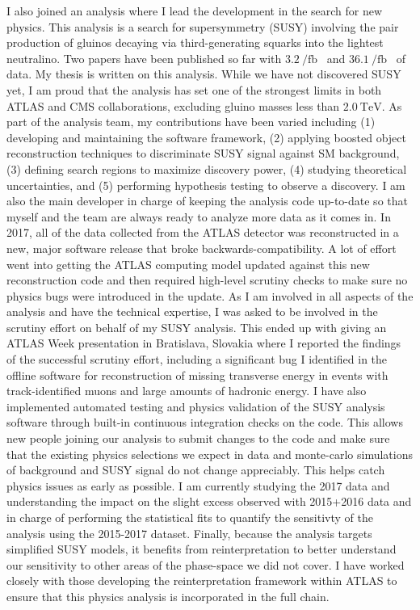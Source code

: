 \documentclass[letterpaper, 10pt]{article}
\begin{document}
I also joined an analysis where I lead the development in the search for new physics. This analysis is a search for supersymmetry (SUSY) involving the pair production of gluinos decaying via third-generating squarks into the lightest neutralino. Two papers have been published so far with $\SI{3.2}{\per\femto\barn}$~ and $\SI{36.1}{\per\femto\barn}$~ of data. My thesis is written on this analysis. While we have not discovered SUSY yet, I am proud that the analysis has set one of the strongest limits in both ATLAS and CMS collaborations, excluding gluino masses less than $\SI{2.0}{\tera\electronvolt}$. As part of the analysis team, my contributions have been varied including (1) developing and maintaining the software framework, (2) applying boosted object reconstruction techniques to discriminate SUSY signal against SM background, (3) defining search regions to maximize discovery power, (4) studying theoretical uncertainties, and (5) performing hypothesis testing to observe a discovery. I am also the main developer in charge of keeping the analysis code up-to-date so that myself and the team are always ready to analyze more data as it comes in. In 2017, all of the data collected from the ATLAS detector was reconstructed in a new, major software release that broke backwards-compatibility. A lot of effort went into getting the ATLAS computing model updated against this new reconstruction code and then required high-level scrutiny checks to make sure no physics bugs were introduced in the update. As I am involved in all aspects of the analysis and have the technical expertise, I was asked to be involved in the scrutiny effort on behalf of my SUSY analysis. This ended up with giving an ATLAS Week presentation in Bratislava, Slovakia where I reported the findings of the successful scrutiny effort, including a significant bug I identified in the offline software for reconstruction of missing transverse energy in events with track-identified muons and large amounts of hadronic energy. I have also implemented automated testing and physics validation of the SUSY analysis software through built-in continuous integration checks on the code. This allows new people joining our analysis to submit changes to the code and make sure that the existing physics selections we expect in data and monte-carlo simulations of background and SUSY signal do not change appreciably. This helps catch physics issues as early as possible. I am currently studying the 2017 data and understanding the impact on the slight excess observed with 2015+2016 data and in charge of performing the statistical fits to quantify the sensitivty of the analysis using the 2015-2017 dataset. Finally, because the analysis targets simplified SUSY models, it benefits from reinterpretation to better understand our sensitivity to other areas of the phase-space we did not cover. I have worked closely with those developing the reinterpretation framework within ATLAS to ensure that this physics analysis is incorporated in the full chain.
\end{document}
